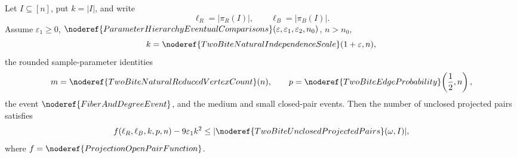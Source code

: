 \begin{lemma}
Let \(I\subseteq[n]\), put \(k=|I|\), and write
\[
\ell_R=|\pi_R(I)|,\qquad \ell_B=|\pi_B(I)|.
\]
Assume \(\varepsilon_1\ge0\),
\(\noderef{ParameterHierarchyEventualComparisons}
(\varepsilon,\varepsilon_1,\varepsilon_2,n_0)\), \(n>n_0\),
\[
k=\noderef{TwoBiteNaturalIndependenceScale}(1+\varepsilon,n),
\]
the rounded sample-parameter identities
\[
m=\noderef{TwoBiteNaturalReducedVertexCount}(n),
\qquad
p=\noderef{TwoBiteEdgeProbability}\!\left(\frac12,n\right),
\]
the event \(\noderef{FiberAndDegreeEvent}\), and the medium and small
closed-pair events.  Then the number of unclosed projected pairs satisfies
\[
f(\ell_R,\ell_B,k,p,n)-9\varepsilon_1k^2
\le |\noderef{TwoBiteUnclosedProjectedPairs}(\omega,I)|,
\]
where \(f=\noderef{ProjectionOpenPairFunction}\).
\end{lemma}
